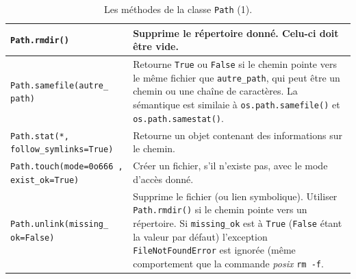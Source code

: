 \documentclass[a4paper,12pt]{book}
\begin{document}
\begin{table}[h]
\begin{center}
\begin{tabular}{|p{4cm}|p{10.5cm}|}
\hline
\texttt{Path.rmdir()} & Supprime le répertoire donné. Celu-ci doit être vide. \\
\hline
\texttt{Path.samefile(autre\_ path)} & Retourne \texttt{True} ou \texttt{False} si le chemin pointe vers le même fichier que \texttt{autre\_path}, qui peut être un chemin ou une chaîne de caractères. La sémantique est similaie à \texttt{os.path.samefile()} et \texttt{os.path.samestat()}. \\
\hline
\texttt{Path.stat(*, follow\_symlinks=True)} & Retourne un objet contenant des informations sur le chemin. \\
\hline
\texttt{Path.touch(mode=0o666
, exist\_ok=True)} & Créer un fichier, s'il n'existe pas, avec le mode d'accès donné. \\
\hline
\texttt{Path.unlink(missing\_
ok=False)} & Supprime le fichier (ou lien symbolique). Utiliser \texttt{Path.rmdir()} si le chemin pointe vers un répertoire. Si \texttt{missing\_ok} est à \texttt{True} (\texttt{False} étant la valeur par défaut) l'exception \texttt{FileNotFoundError} est ignorée (même comportement que la commande \textit{posix} \texttt{rm -f}. \\
\hline
\end{tabular}
\caption{Les méthodes de la classe \texttt{Path} (1).}
\end{center}
\end{table}
\medskip
\end{document}
